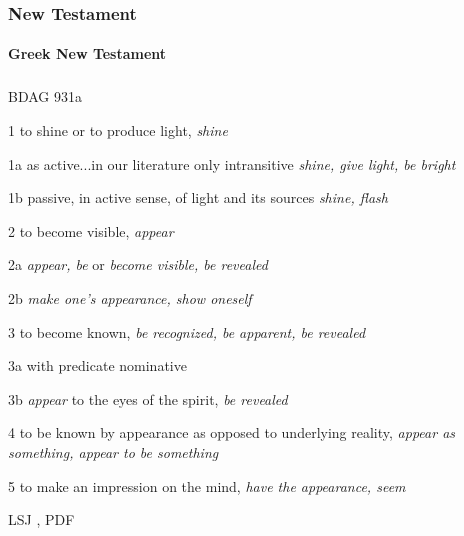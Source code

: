 	\subsubsection{New Testament} %
		\label{SHINE-NT}
	
			
	
			
			
		\paragraph{Greek New Testament} %
			\label{SHINE-GREEK}
		
			\subparagraph{\texorpdfstring{}{}}
				\label{PHAINO}
			
				\begin{compactdesc}
					\item[BDAG 931a] \textbf{}
						\begin{compactitem}
							\item[1] to shine or to produce light, \textit{shine}
							\item[1a] as active...in our literature only intransitive \textit{shine, give light, be bright}
							\item[1b] passive, in active sense, of light and its sources \textit{shine, flash}
							\item[2] to become visible, \textit{appear}
							\item[2a] \textit{appear, be} or \textit{become visible, be revealed}
							\item[2b] \textit{make one's appearance, show oneself}
							\item[3] to become known, \textit{be recognized, be apparent, be revealed}
							\item[3a] with predicate nominative
							\item[3b] \textit{appear} to the eyes of the spirit, \textit{be revealed}
							\item[4] to be known by appearance as opposed to underlying reality, \textit{appear as something, appear to be something}
							\item[5] to make an impression on the mind, \textit{have the appearance, seem}
						\end{compactitem}
					\item[LSJ , PDF ] \textbf{}
						\begin{compactitem}
							\item 
						\end{compactitem}
				\end{compactdesc}
				
